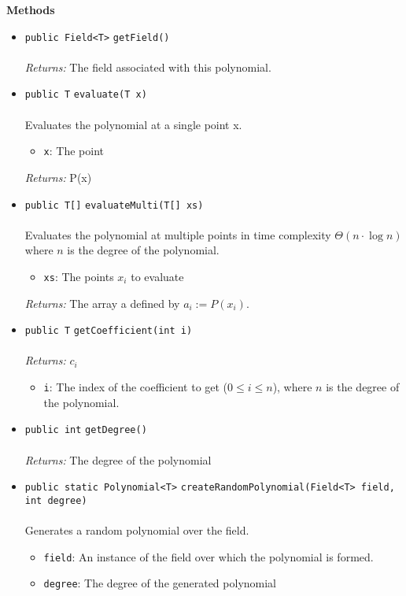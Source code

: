 \textbf{\sffamily Methods}
\begin{itemize}
\item \lstinline|public Field<T>| \lstinline|getField|\lstinline|()|\\ \\[-0.6em]
\emph{Returns:} The field associated with this polynomial.



\item \lstinline|public T| \lstinline|evaluate|\lstinline|(T x)|\\ \\[-0.6em]
Evaluates the polynomial at a single point x.
\begin{itemize}
\item \lstinline|x|: The point
\end{itemize}

\emph{Returns:} P(x)

\item \lstinline|public T[]| \lstinline|evaluateMulti|\lstinline|(T[] xs)|\\ \\[-0.6em]
Evaluates the polynomial at multiple points in time complexity $\Theta(n\cdot\log
 n)$ where $n$ is the degree of the polynomial.
\begin{itemize}
\item \lstinline|xs|: The points $x_i$ to evaluate
\end{itemize}

\emph{Returns:} The array a defined by $a_i := P(x_i)$.

\item \lstinline|public T| \lstinline|getCoefficient|\lstinline|(int i)|\\ \\[-0.6em]
\emph{Returns:} $c_i$
\begin{itemize}
\item \lstinline|i|: The index of the coefficient to get ($0 \leq i \leq n$), where
          $n$ is the degree of the polynomial.
\end{itemize}



\item \lstinline|public int| \lstinline|getDegree|\lstinline|()|\\ \\[-0.6em]
\emph{Returns:} The degree of the polynomial



\item \lstinline|public static Polynomial<T>| \lstinline|createRandomPolynomial|\lstinline|(Field<T> field, int degree)|\\ \\[-0.6em]
Generates a random polynomial over the field.
\begin{itemize}
\item \lstinline|field|: An instance of the field over which the polynomial is formed.
\item \lstinline|degree|: The degree of the generated polynomial
\end{itemize}


\end{itemize}
